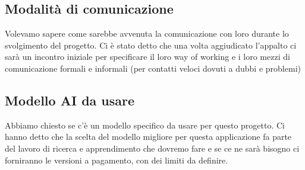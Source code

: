 \documentclass[italian, 12pt]{article}
\begin{document}
\subsection{Modalità di comunicazione}
Volevamo sapere come sarebbe avvenuta la comunicazione con loro durante lo svolgimento del progetto. Ci è stato detto che una volta aggiudicato l'appalto ci sarà un incontro iniziale per specificare il loro way of working e i loro mezzi di comunicazione formali e informali (per contatti veloci dovuti a dubbi e problemi)

\subsection{Modello AI da usare}
Abbiamo chiesto se c'è un modello specifico da usare per questo progetto. Ci hanno detto che la scelta del modello migliore per questa applicazione fa parte del lavoro di ricerca e apprendimento che dovremo fare e se ce ne sarà bisogno ci forniranno le versioni a pagamento, con dei limiti da definire.
\end{document}
